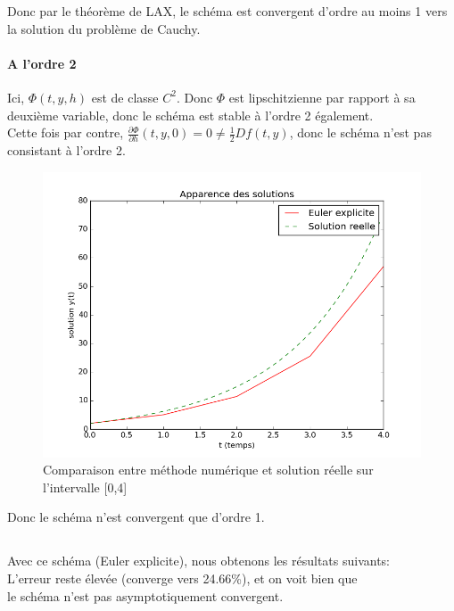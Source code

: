 \documentclass[a4paper,12pt,landscape]{article}
\begin{document}
Donc par le théorème de LAX, le schéma est convergent d'ordre au moins 1 vers la solution du problème de Cauchy.

\paragraph{A l'ordre 2}
Ici, $\Phi(t,y,h)$ est de classe $C^2$. Donc $\Phi$ est lipschitzienne par rapport à sa deuxième variable, donc le schéma est stable à l'ordre 2 également.\\
Cette fois par contre, $\frac{\partial \Phi}{\partial h} (t,y,0)=0 \neq \frac{1}{2}Df(t,y)$, donc le schéma n'est pas consistant à l'ordre 2.\\
\begin{figure}
	\includegraphics[scale=0.45]{ex2.png}
	\caption{Comparaison entre méthode numérique et solution réelle sur l'intervalle [0,4]}
\end{figure}
Donc le schéma n'est convergent que d'ordre 1.

\subsection{}

Avec ce schéma (Euler explicite), nous obtenons les résultats suivants:\\
L'erreur reste élevée (converge vers 24.66\%), et on voit bien que\\ le schéma n'est pas asymptotiquement convergent.
\end{document}
